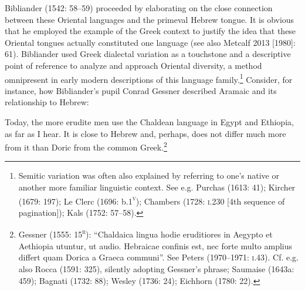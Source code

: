 \documentclass[12pt]{article}
\newenvironment{styleStandard}{\renewcommand\baselinestretch{1.25}\setlength\leftskip{0in}\setlength\rightskip{0in}\setlength\parindent{0.1972in}\setlength\parfillskip{0pt plus 1fil}\setlength\parskip{0in plus 1pt}\writerlistparindent\writerlistleftskip\leavevmode\normalfont\normalsize\writerlistlabel\ignorespaces}{\unskip\vspace{0in plus 1pt}\par}
\newenvironment{styleQuote}{\renewcommand\baselinestretch{1.25}\setlength\leftskip{0.3937in}\setlength\rightskip{0in}\setlength\parindent{0in}\setlength\parfillskip{0pt plus 1fil}\setlength\parskip{0.1665in plus 0.016649999in}\writerlistparindent\writerlistleftskip\leavevmode\normalfont\normalsize\writerlistlabel\ignorespaces}{\unskip\vspace{0.1665in plus 0.016649999in}\par}
\newcommand\writerlistleftskip{}
\newcommand\writerlistparindent{}
\newcommand\writerlistlabel{}
\begin{document}
\begin{styleStandard}
Bibliander (1542: 58–59) proceeded by elaborating on the close connection between these Oriental languages and the primeval Hebrew tongue. It is obvious that he employed the example of the Greek context to justify the idea that these Oriental tongues actually constituted one language (see also Metcalf 2013 [1980]: 61). Bibliander used Greek dialectal variation as a touchstone and a descriptive point of reference to analyze and approach Oriental diversity, a method omnipresent in early modern descriptions of this language family.\footnote{ Semitic variation was often also explained by referring to one’s native or another more familiar linguistic context. See e.g. Purchas (1613: 41); Kircher (1679: 197); Le Clerc (1696: b.1\textsc{\textsuperscript{v}}); Chambers (1728: \textsc{i.}230 [4th sequence of pagination]); Kals (1752: 57–58).} Consider, for instance, how Bibliander’s pupil Conrad Gessner described Aramaic and its relationship to Hebrew:
\end{styleStandard}

\begin{styleQuote}
Today, the more erudite men use the Chaldean language in Egypt and Ethiopia, as far as I hear. It is close to Hebrew and, perhaps, does not differ much more from it than Doric from the common Greek.\footnote{ Gessner (1555: 15\textsc{\textsuperscript{r}}): “Chaldaica lingua hodie eruditiores in Aegypto et Aethiopia utuntur, ut audio. Hebraicae confinis est, nec forte multo amplius differt quam Dorica a Graeca communi”. See Peters (1970–1971: \textsc{i.}43). Cf. e.g. also Rocca (1591: 325), silently adopting Gessner’s phrase; Saumaise (1643a: 459); Bagnati (1732: 88); Wesley (1736: 24); Eichhorn (1780: 22).}
\end{styleQuote}
\end{document}
